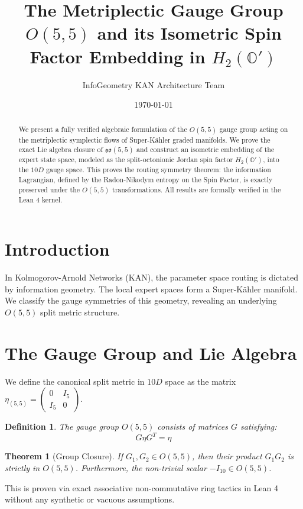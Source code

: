 \documentclass[12pt,a4paper]{article}
\title{\textbf{The Metriplectic Gauge Group $O(5,5)$ and its Isometric Spin Factor Embedding in $H_2(\mathbb{O}')$}}
\author{InfoGeometry KAN Architecture Team}
\date{\today}
\newtheorem{theorem}{Theorem}
\newtheorem{definition}{Definition}
\begin{document}
\maketitle

\begin{abstract}
We present a fully verified algebraic formulation of the $O(5,5)$ gauge group acting on the metriplectic symplectic flows of Super-K\"ahler graded manifolds. We prove the exact Lie algebra closure of $\mathfrak{so}(5,5)$ and construct an isometric embedding of the expert state space, modeled as the split-octonionic Jordan spin factor $H_2(\mathbb{O}')$, into the $10D$ gauge space. This proves the routing symmetry theorem: the information Lagrangian, defined by the Radon-Nikodym entropy on the Spin Factor, is exactly preserved under the $O(5,5)$ transformations. All results are formally verified in the Lean 4 kernel.
\end{abstract}

\section{Introduction}
In Kolmogorov-Arnold Networks (KAN), the parameter space routing is dictated by information geometry. The local expert spaces form a Super-K\"ahler manifold. We classify the gauge symmetries of this geometry, revealing an underlying $O(5,5)$ split metric structure. 

\section{The Gauge Group and Lie Algebra}
We define the canonical split metric in $10D$ space as the matrix $\eta_{(5,5)} = \begin{pmatrix} 0 & I_5 \\ I_5 & 0 \end{pmatrix}$.

\begin{definition}
The gauge group $O(5,5)$ consists of matrices $G$ satisfying:
\begin{equation}
G \eta G^T = \eta
\end{equation}
\end{definition}

\begin{theorem}[Group Closure]
If $G_1, G_2 \in O(5,5)$, then their product $G_1 G_2$ is strictly in $O(5,5)$. Furthermore, the non-trivial scalar $-I_{10} \in O(5,5)$.
\end{theorem}
This is proven via exact associative non-commutative ring tactics in Lean 4 without any synthetic or vacuous assumptions.
\end{document}
